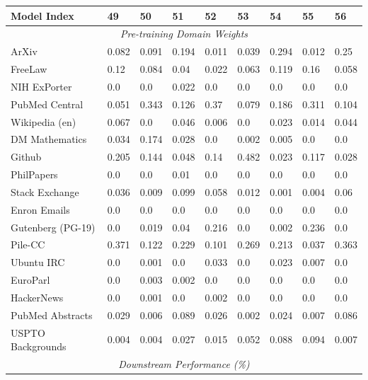 \begin{table}[!ht]
    \centering
    \begin{tabular}{lllllllll}
    \toprule
        \textbf{Model Index} & \textbf{49} & \textbf{50} & \textbf{51} & \textbf{52} & \textbf{53} & \textbf{54} & \textbf{55} & \textbf{56} \\ \midrule
        \multicolumn{9}{c}{\textit{Pre-training Domain Weights}} \\
        ArXiv & 0.082 & 0.091 & 0.194 & 0.011 & 0.039 & 0.294 & 0.012 & 0.25 \\ 
        FreeLaw & 0.12 & 0.084 & 0.04 & 0.022 & 0.063 & 0.119 & 0.16 & 0.058 \\ 
        NIH ExPorter & 0.0 & 0.0 & 0.022 & 0.0 & 0.0 & 0.0 & 0.0 & 0.0 \\ 
        PubMed Central & 0.051 & 0.343 & 0.126 & 0.37 & 0.079 & 0.186 & 0.311 & 0.104 \\ 
        Wikipedia (en) & 0.067 & 0.0 & 0.046 & 0.006 & 0.0 & 0.023 & 0.014 & 0.044 \\ 
        DM Mathematics & 0.034 & 0.174 & 0.028 & 0.0 & 0.002 & 0.005 & 0.0 & 0.0 \\ 
        Github & 0.205 & 0.144 & 0.048 & 0.14 & 0.482 & 0.023 & 0.117 & 0.028 \\ 
        PhilPapers & 0.0 & 0.0 & 0.01 & 0.0 & 0.0 & 0.0 & 0.0 & 0.0 \\ 
        Stack Exchange & 0.036 & 0.009 & 0.099 & 0.058 & 0.012 & 0.001 & 0.004 & 0.06 \\ 
        Enron Emails & 0.0 & 0.0 & 0.0 & 0.0 & 0.0 & 0.0 & 0.0 & 0.0 \\ 
        Gutenberg (PG-19) & 0.0 & 0.019 & 0.04 & 0.216 & 0.0 & 0.002 & 0.236 & 0.0 \\ 
        Pile-CC & 0.371 & 0.122 & 0.229 & 0.101 & 0.269 & 0.213 & 0.037 & 0.363 \\ 
        Ubuntu IRC & 0.0 & 0.001 & 0.0 & 0.033 & 0.0 & 0.023 & 0.007 & 0.0 \\ 
        EuroParl & 0.0 & 0.003 & 0.002 & 0.0 & 0.0 & 0.0 & 0.0 & 0.0 \\ 
        HackerNews & 0.0 & 0.001 & 0.0 & 0.002 & 0.0 & 0.0 & 0.0 & 0.0 \\ 
        PubMed Abstracts & 0.029 & 0.006 & 0.089 & 0.026 & 0.002 & 0.024 & 0.007 & 0.086 \\ 
        USPTO Backgrounds & 0.004 & 0.004 & 0.027 & 0.015 & 0.052 & 0.088 & 0.094 & 0.007 \\ 
        \midrule
        \multicolumn{9}{c}{\textit{Downstream Performance (\%)}} \\

\end{tabular}
\end{table}
